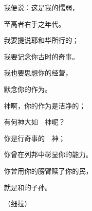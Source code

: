 {\Q {}我便说：这是我的懦弱，
\par }{至高者{}右手之年代。
\par }{\BB \par }{\Q {}我要提说耶和华所行的；
\par }{\Q 我要记念你古时的奇事。
\par }{\Q {}我也要思想你的经营，
\par }{\Q 默念你的作为。
\par }{\Q {}神啊，你的作为是洁净的；
\par }{\Q 有何神大如　神呢？
\par }{\Q {}你是行奇事的　神；
\par }{\Q 你曾在列邦中彰显你的能力。
\par }{\Q {}你曾用你的膀臂赎了你的民，
\par }{\Q 就是{}和{}的子孙。
\par }{\QS （细拉）
\par }
